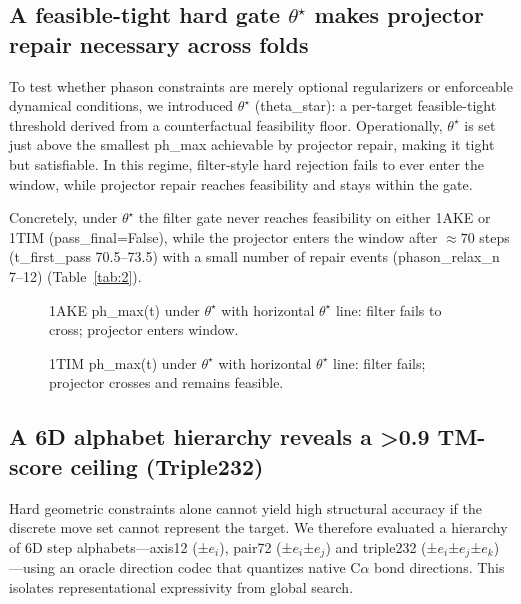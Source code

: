 \subsection{A feasible-tight hard gate $\theta^\star$ makes projector repair necessary across folds}

To test whether phason constraints are merely optional regularizers or enforceable dynamical conditions, we introduced $\theta^\star$ (theta\_star): a per-target feasible-tight threshold derived from a counterfactual feasibility floor. Operationally, $\theta^\star$ is set just above the smallest ph\_max achievable by projector repair, making it tight but satisfiable. In this regime, filter-style hard rejection fails to ever enter the window, while projector repair reaches feasibility and stays within the gate.

\begin{table}[t]
  \centering
  \caption{$\theta^\star$ hard-gate feasibility: filter vs projector repair.}
  \label{tab:2}
\end{table}

Concretely, under $\theta^\star$ the filter gate never reaches feasibility on either 1AKE or 1TIM (pass\_final=False), while the projector enters the window after \(\approx 70\) steps (t\_first\_pass 70.5–73.5) with a small number of repair events (phason\_relax\_n 7–12) (Table~\ref{tab:2}).

\begin{figure}[t]
  \centering
  \caption{1AKE ph\_max(t) under $\theta^\star$ with horizontal $\theta^\star$ line: filter fails to cross; projector enters window.}
  \label{fig:6}
\end{figure}

\begin{figure}[t]
  \centering
  \caption{1TIM ph\_max(t) under $\theta^\star$ with horizontal $\theta^\star$ line: filter fails; projector crosses and remains feasible.}
  \label{fig:7}
\end{figure}

\subsection{A 6D alphabet hierarchy reveals a >0.9 TM-score ceiling (Triple232)}

Hard geometric constraints alone cannot yield high structural accuracy if the discrete move set cannot represent the target. We therefore evaluated a hierarchy of 6D step alphabets—axis12 (±$e_i$), pair72 (±$e_i$±$e_j$) and triple232 (±$e_i$±$e_j$±$e_k$)—using an oracle direction codec that quantizes native C$\alpha$ bond directions. This isolates representational expressivity from global search.

